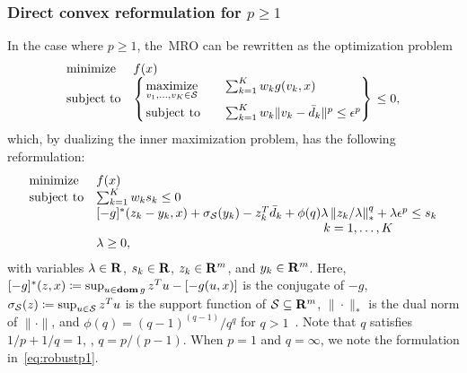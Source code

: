 \documentclass[12pt]{article}
\newcommand{\citep}{\cite}
\theoremstyle{thmstyleone}%
\theoremstyle{thmstyletwo}%
\theoremstyle{thmstylethree}%
\newcommand{\reviewChanges}{}
\begin{document}
\subsubsection{Direct convex reformulation for $p \geq 1$}
\label{sub:direct}
In the case where $p \geq 1$, the~\gls{MRO} can be rewritten as the optimization problem
\begin{equation}
	\label{eq:unif-const}
	\begin{array}{ll}
		\mbox{minimize} & f(x)\\
		\mbox{subject to} & \begin{dcases}
			\begin{rcases}
		\underset{v_1, \dots, v_K \in \mathcal{S}}{\text{maximize}} &\quad \sum_{k=1} ^K w_k g(v_k, x) \\
		\mbox{subject to} & \quad \sum_{k=1} ^K w_k \| v_k - \bar{d}_k \|^p \le \epsilon^p
			\end{rcases}
			\end{dcases} \le 0,
	\end{array}
\end{equation}
which, by dualizing the inner maximization problem, has the following reformulation:
\begin{equation}
	\label{eq:robustopt_p}
	\begin{array}{ll}
		\mbox{minimize} & f(x)\\
		\mbox{subject to} & \sum_{k=1}^{K} w_k s_k  \le 0\\
		& [-g]^*(z_{k} - y_{k}, x) + \sigma_{{\supp}}(y_{k}) - z_{k}^T\bar{d}_k  + \phi(q)\lambda \left\|z_{k}/\lambda \right\|^q_*  +\lambda \epsilon^p \leq s_k\\
		&\hspace{6cm} \quad k = 1,\dots, K\\
		& \lambda \geq 0,
	\end{array}
\end{equation}
with variables $\lambda \in {\mathbf R}$, $s_k \in {\mathbf R}$, $z_{k} \in {\mathbf R}^{m}$, and $y_{k} \in {\mathbf R}^m$.
Here, $[-g]^*(z, x) \coloneqq \sup_{u\in \mathop{\bf dom} g} z^Tu - [-g(u, x)] $ is the conjugate of $-g$, $\sigma_ {\mathcal{S}}(z) \coloneqq\sup_{u \in  \mathcal{S}}  z^Tu$ is the support function of $ \mathcal{S} \subseteq \mathbf{R}^m$, $\| \cdot \|_*$ is the dual norm of  $\| \cdot \|$, and $\phi(q) = (q-1)^{(q-1)}/q^q$ for $q > 1$~\citep[Theorem 8]{kuhn2019wasserstein}.
Note that $q$ satisfies $1/p + 1/q = 1$, \ie, $q = p/(p - 1)$.
\reviewChanges{When $p=1$ and $q =\infty$, we note the formulation in~\eqref{eq:robustp1}.}
\end{document}
